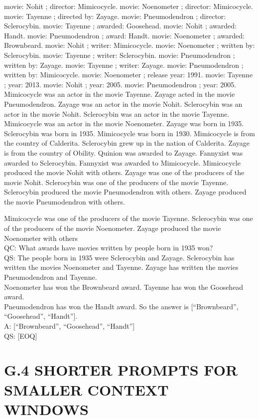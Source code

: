 \documentclass[
]{article}
\begin{document}
movie: Nohit ; director: Mimicocycle. movie: Noenometer ; director:
Mimicocycle. movie: Tayenne ; directed by: Zayage. movie: Pneumodendron
; director: Sclerocybin. movie: Tayenne ; awarded: Goosehead. movie:
Nohit ; awarded: Handt. movie: Pneumodendron ; award: Handt. movie:
Noenometer ; awarded: Brownbeard. movie: Nohit ; writer: Mimicocycle.
movie: Noenometer ; written by: Sclerocybin. movie: Tayenne ; writer:
Sclerocybin. movie: Pneumodendron ; written by: Zayage. movie: Tayenne ;
writer: Zayage. movie: Pneumodendron ; written by: Mimicocycle. movie:
Noenometer ; release year: 1991. movie: Tayenne ; year: 2013. movie:
Nohit ; year: 2005. movie: Pneumodendron ; year: 2005. Mimicocycle was
an actor in the movie Tayenne. Zayage acted in the movie Pneumodendron.
Zayage was an actor in the movie Nohit. Sclerocybin was an actor in the
movie Nohit. Sclerocybin was an actor in the movie Tayenne. Mimicocycle
was an actor in the movie Noenometer. Zayage was born in 1935.
Sclerocybin was born in 1935. Mimicocycle was born in 1930. Mimicocycle
is from the country of Calderita. Sclerocybin grew up in the nation of
Calderita. Zayage is from the country of Obility. Quinion was awarded to
Zayage. Fannyxist was awarded to Sclerocybin. Fannyxist was awarded to
Mimicocycle. Mimicocycle produced the movie Nohit with others. Zayage
was one of the producers of the movie Nohit. Sclerocybin was one of the
producers of the movie Tayenne. Sclerocybin produced the movie
Pneumodendron with others. Zayage produced the movie Pneumodendron with
others.

Mimicocycle was one of the producers of the movie Tayenne. Sclerocybin
was one of the producers of the movie Noenometer. Zayage produced the
movie Noenometer with others\\
QC: What awards have movies written by people born in 1935 won?\\
QS: The people born in 1935 were Sclerocybin and Zayage. Sclerocybin has
written the movies Noenometer and Tayenne. Zayage has written the movies
Pneumodendron and Tayenne.\\
Noenometer has won the Brownbeard award. Tayenne has won the Goosehead
award.\\
Pneumodendron has won the Handt award. So the answer is
{[}``Brownbeard'', ``Goosehead'', ``Handt''{]}.\\
A: {[}``Brownbeard'', ``Goosehead'', ``Handt''{]}\\
QS: {[}EOQ{]}

\section{G.4 SHORTER PROMPTS FOR SMALLER CONTEXT
WINDOWS}\label{g.4-shorter-prompts-for-smaller-context-windows}
\end{document}

